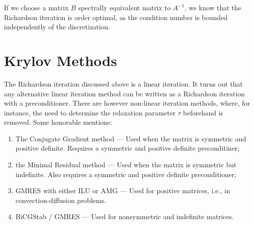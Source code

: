 If we choose a matrix \(B\) spectrally equivalent matrix to \( A^{-1} \), we
know that the Richardson iteration is order optimal, as the condition number is
bounded independently of the discretization.

\section{Krylov Methods}
\label{sec:krylov_methods}

The Richardson iteration discussed above is a linear iteration. It turns out
that any alternative linear iteration method can be written as a Richardson
iteration with a preconditioner. There are however non-linear iteration
methods, where, for instance, the need to determine the relaxation parameter \(
\tau \) beforehand is removed. Some honorable mentions:
\begin{enumerate}
    \item The Conjugate Gradient method --- Used when the matrix is symmetric
        and positive definite. Requires a symmetric and positive definite
        preconditiner;
    \item the Minimal Residual method --- Used when the matrix is symmetric but
        indefinite. Also requires a symmetric and positive definite
        preconditioner; 
    \item GMRES with either ILU or AMG --- Used for positive matrices, i.e., in
        convection-diffusion problems.
    \item BiCGStab / GMRES --- Used for nonsymmetric and indefinite matrices.
\end{enumerate}
